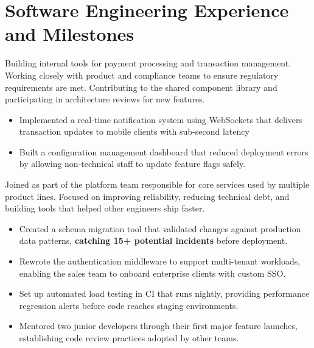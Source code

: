 \documentclass{custom}
\begin{document}
\section{Software Engineering Experience and Milestones}
\label{experience}

\begin{cvdescription}
Building internal tools for payment processing and transaction management.
Working closely with product and compliance teams to ensure regulatory
requirements are met. Contributing to the shared component library and
participating in architecture reviews for new features.
\end{cvdescription}

\begin{itemize}\setlength{\itemsep}{-2pt}
\item Implemented a real-time notification system using WebSockets that
delivers transaction updates to mobile clients with sub-second latency
\item Built a configuration management dashboard that reduced deployment
errors by allowing non-technical staff to update feature flags safely.
\end{itemize}

\begin{cvdescription}
Joined as part of the platform team responsible for core services used by
multiple product lines. Focused on improving reliability, reducing technical
debt, and building tools that helped other engineers ship faster.
\end{cvdescription}

\begin{itemize}\setlength{\itemsep}{-2pt}
\item Created a schema migration tool that validated changes against production
data patterns, \textbf{catching 15+ potential incidents} before deployment.
\item Rewrote the authentication middleware to support multi-tenant workloads,
enabling the sales team to onboard enterprise clients with custom SSO.
\item Set up automated load testing in CI that runs nightly, providing performance
regression alerts before code reaches staging environments.
\item Mentored two junior developers through their first major feature launches,
establishing code review practices adopted by other teams.
\end{itemize}
\end{document}

